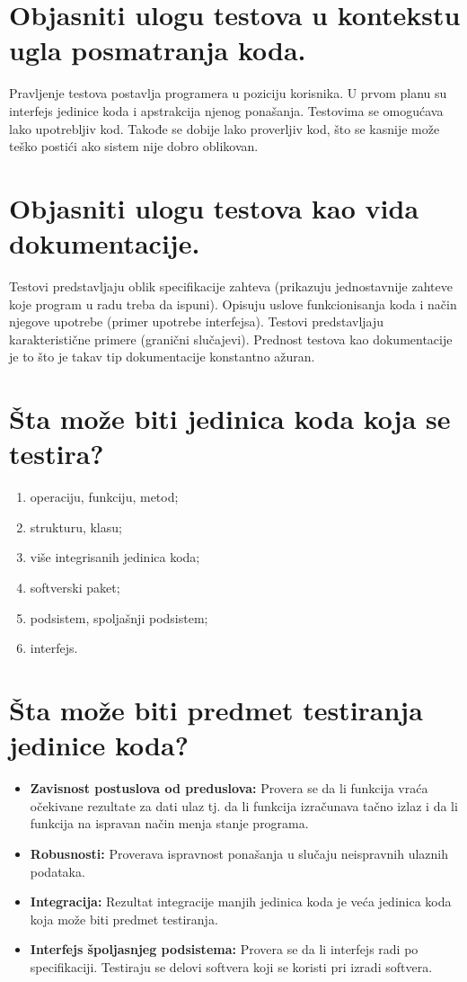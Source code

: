 \documentclass[a4paper]{article}
\begin{document}
\section{Objasniti ulogu testova u kontekstu ugla posmatranja koda.}
  Pravljenje testova postavlja programera u poziciju korisnika. U prvom planu su interfejs 
  jedinice koda i apstrakcija njenog ponašanja. Testovima se omogućava lako upotrebljiv kod.
  Takođe se dobije lako proverljiv kod, što se kasnije može teško postići ako sistem nije 
  dobro oblikovan.
  
\section{Objasniti ulogu testova kao vida dokumentacije.}
  Testovi predstavljaju oblik specifikacije zahteva (prikazuju jednostavnije zahteve koje 
  program u radu treba da ispuni). Opisuju uslove funkcionisanja koda i način njegove upotrebe 
  (primer upotrebe interfejsa). Testovi predstavljaju karakteristične primere (granični slučajevi). 
  Prednost testova kao dokumentacije je to što je takav tip dokumentacije konstantno ažuran.

\section{Šta može biti jedinica koda koja se testira?}
  \label{q_sta_moze_biti_jedinica_koda_koja_se_testira}
  \begin{enumerate}
    \item operaciju, funkciju, metod;
    \item strukturu, klasu;
    \item više integrisanih jedinica koda;
    \item softverski paket;
    \item podsistem, spoljašnji podsistem;
    \item interfejs.
  \end{enumerate}

\section{Šta može biti predmet testiranja jedinice koda?}
  \label{q_sta_moze_biti_predmet_testiranja_jedinice_koda}
  \begin{itemize}
    \item \textbf{Zavisnost postuslova od preduslova:} Provera se da li funkcija vraća očekivane
          rezultate za dati ulaz tj. da li funkcija izračunava tačno izlaz i da li funkcija
          na ispravan način menja stanje programa.
    \item \textbf{Robusnosti:} Proverava ispravnost ponašanja u slučaju neispravnih ulaznih podataka.
    \item \textbf{Integracija:} Rezultat integracije manjih jedinica koda je veća jedinica koda koja
          može biti predmet testiranja.
    \item \textbf{Interfejs špoljasnjeg podsistema:} Provera se da li interfejs radi po specifikaciji.
          Testiraju se delovi softvera koji se koristi pri izradi softvera.
  \end{itemize}
\end{document}

